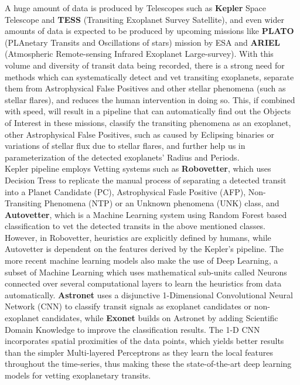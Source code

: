 




A huge amount of data is produced by Telescopes such as \textbf{Kepler} Space Telescope and \textbf{TESS} (Transiting Exoplanet Survey Satellite), and even wider amounts of data is expected to be produced by upcoming missions like \textbf{PLATO} (PLAnetary Transits and Oscillations of stars) mission by ESA and \textbf{ARIEL} (Atmospheric Remote-sensing Infrared Exoplanet Large-survey). With this volume and diversity of transit data being recorded, there is a strong need for methods which can systematically detect and vet transiting exoplanets, separate them from Astrophysical False Positives and other stellar phenomena (such as stellar flares), and reduces the human intervention in doing so. This, if combined with speed, will result in a pipeline that can automatically find out the Objects of Interest in these missions, classify the transiting phenomena as an exoplanet, other Astrophysical False Positives, such as caused by Eclipsing binaries or variations of stellar flux due to stellar flares, and further help us in parameterization of the detected exoplanets' Radius and Periods.\\

Kepler pipeline employs Vetting systems such as \textbf{Robovetter}, which uses Decision Tress to replicate the manual process of separating a detected transit into a Planet Candidate (PC), Astrophysical Fasle Positive (AFP), Non-Transiting Phenomena (NTP) or an Unknown phenomena (UNK) class, and \textbf{Autovetter}, which is a Machine Learning system using Random Forest based classification to vet the detected transits in the above mentioned classes. However, in Robovetter, heuristics are explicitly defined by humans, while Autovetter is dependent on the features derived by the Kepler's pipeline. The more recent machine learning models also make the use of Deep Learning, a subset of Machine Learning which uses mathematical sub-units called Neurons connected over several computational layers to learn the heuristics from data automatically. \textbf{Astronet} uses a disjunctive 1-Dimensional Convolutional Neural Network (CNN) to classify transit signals as exoplanet candidates or non-exoplanet candidates, while \textbf{Exonet} builds on Astronet by adding Scientific Domain Knowledge to improve the classification results. The 1-D CNN incorporates spatial proximities of the data points, which yields better results than the simpler Multi-layered Perceptrons as they learn the local features throughout the time-series, thus making these the state-of-the-art deep learning models for vetting exoplanetary transits.\\


